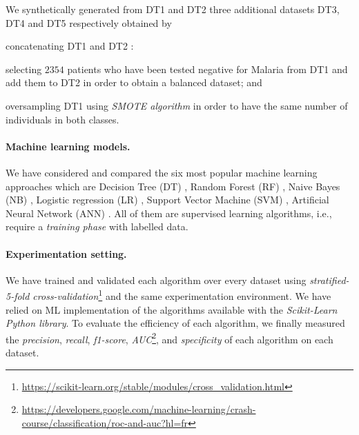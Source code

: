 We synthetically generated from DT1 and DT2 three additional datasets DT3, DT4 and DT5  respectively obtained by 
\begin{inparaenum}[(i)]
 \item concatenating DT1 and DT2 :
\item selecting $2354$ patients who have been tested negative for Malaria from DT1 and add them to DT2 in order to obtain a balanced dataset; and
\item oversampling DT1 using \emph{SMOTE algorithm} in order to have the same number of individuals in both classes.
\end{inparaenum}

\paragraph*{\bf Machine learning models.}
We have considered and compared the six most popular machine learning approaches \cite{de2018binary,tomar2013survey} which are
Decision Tree (DT)  \cite{Ro05}, Random Forest (RF) \cite{Be01},  Naive Bayes (NB) \cite{Ka17},
Logistic regression (LR) \cite{Ph88}, Support Vector Machine (SVM) \cite{Ev01}, Artificial Neural Network (ANN) \cite{Me19}.
 All of them are supervised learning algorithms, i.e., require a \emph{training phase} with labelled data.

 \paragraph*{\bf Experimentation setting.}
 We have trained and validated each algorithm over every dataset using \emph{stratified-5-fold cross-validation}\footnote{\tiny{\url{https://scikit-learn.org/stable/modules/cross\_validation.html}}} and the same experimentation environment.
 We have relied on ML implementation of the algorithms available with the \emph{Scikit-Learn Python library}.  To evaluate the efficiency of each algorithm,  we finally 
 measured  the \emph{precision}, \emph{recall}, \emph{f1-score}, \emph{AUC}\footnote{\tiny{\url{https://developers.google.com/machine-learning/crash-course/classification/roc-and-auc?hl=fr}}}, and
 \emph{specificity} of each algorithm on each dataset. 
